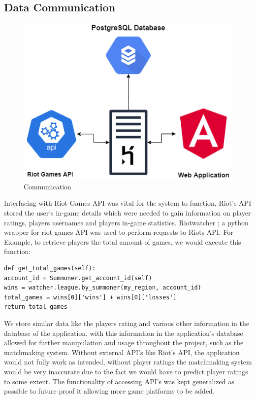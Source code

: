 \subsection{Data Communication}
\begin{figure}[H]
	\centering      
	\includegraphics[width=\textwidth/2,height=\textheight/2,keepaspectratio]{img/Communication.png}
	\caption{Communication}
	\label{tikz:communication}
\end{figure}
Interfacing with Riot Games API was vital for the system to function, Riot's API stored the user's in-game details which were needed to gain information on player ratings, players usernames and players in-game statistics.\hfill \break 
Riotwatcher \cite{riotwatcher}; a python wrapper for riot games API was used to perform requests to Riots API.\hfill \break
For Example, to retrieve players the total amount of games, we would execute this function:
\begin{verbatim}
def get_total_games(self):
account_id = Summoner.get_account_id(self)
wins = watcher.league.by_summoner(my_region, account_id)
total_games = wins[0]['wins'] + wins[0]['losses']
return total_games
\end{verbatim}
We store similar data like the players rating and various other information in the database of the application, with this information in the application's database allowed for further manipulation and usage throughout the project, such as the matchmaking system. Without external API's like Riot's API, the application would not fully work as intended, without player ratings the matchmaking system would be very inaccurate due to the fact we would have to predict player ratings to some extent.\hfill \break 
The functionality of accessing API's was kept generalized as possible to future proof it allowing more game platforms to be added.\hfill \break 
\newpage

